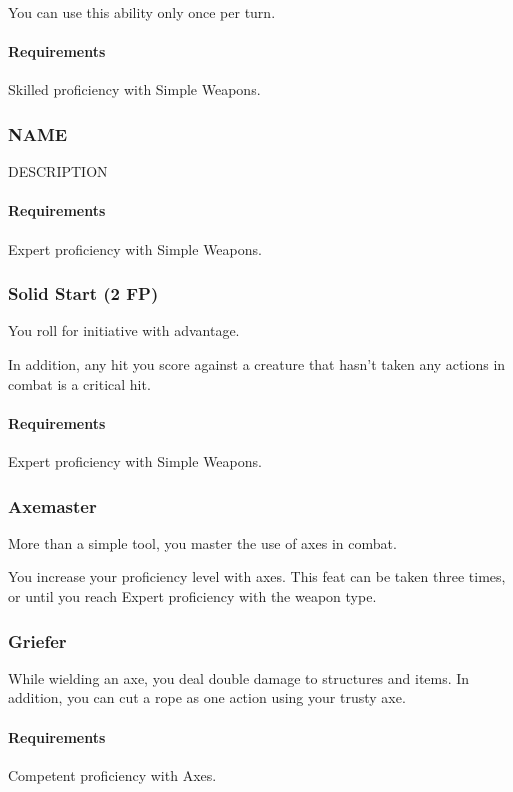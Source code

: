     You can use this ability only once per turn.
    \paragraph{Requirements} Skilled proficiency with Simple Weapons.
\subsubsection{NAME} \label{feat::name}
    DESCRIPTION
    \paragraph{Requirements} Expert proficiency with Simple Weapons.
\subsubsection{Solid Start (2 FP)} \label{feat::solidstart}
    You roll for initiative with advantage.

    In addition, any hit you score against a creature that hasn't taken any actions in combat is a critical hit.
    \paragraph{Requirements} Expert proficiency with Simple Weapons.

\subsubsection{Axemaster} \label{feat::axemaster}
    More than a simple tool, you master the use of axes in combat.

    You increase your proficiency level with axes.
    This feat can be taken three times, or until you reach Expert proficiency with the weapon type.
\subsubsection{Griefer} \label{feat::griefer}
    While wielding an axe, you deal double damage to structures and items.
    In addition, you can cut a rope as one action using your trusty axe.
    \paragraph{Requirements} Competent proficiency with Axes.
